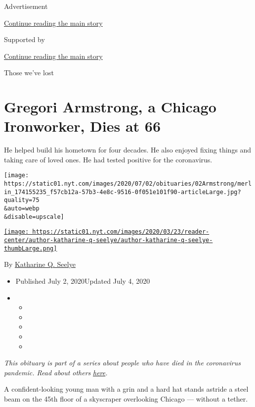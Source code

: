 Advertisement

\protect\hyperlink{after-top}{Continue reading the main story}

Supported by

\protect\hyperlink{after-sponsor}{Continue reading the main story}

Those we've lost

\hypertarget{gregori-armstrong-a-chicago-ironworker-dies-at-66}{%
\section{Gregori Armstrong, a Chicago Ironworker, Dies at
66}\label{gregori-armstrong-a-chicago-ironworker-dies-at-66}}

He helped build his hometown for four decades. He also enjoyed fixing
things and taking care of loved ones. He had tested positive for the
coronavirus.

\texttt{[image: https://static01.nyt.com/images/2020/07/02/obituaries/02Armstrong/merlin\_174155235\_f57cb12a-57b3-4e8c-9516-0f051e101f90-articleLarge.jpg?quality=75\\\&auto=webp\\\&disable=upscale]}

\href{https://www.nytimes.com/by/katharine-q-seelye}{\texttt{[image: https://static01.nyt.com/images/2020/03/23/reader-center/author-katharine-q-seelye/author-katharine-q-seelye-thumbLarge.png]}}

By \href{https://www.nytimes.com/by/katharine-q-seelye}{Katharine Q.
Seelye}

\begin{itemize}
\item
  Published July 2, 2020Updated July 4, 2020
\item
  \begin{itemize}
  \item
  \item
  \item
  \item
  \item
  \end{itemize}
\end{itemize}

\emph{This obituary is part of a series about people who have died in
the coronavirus pandemic. Read about others}
\href{https://www.nytimes.com/interactive/2020/obituaries/people-died-coronavirus-obituaries.html}{\emph{here}}\emph{.}

A confident-looking young man with a grin and a hard hat stands astride
a steel beam on the 45th floor of a skyscraper overlooking Chicago ---
without a tether.

